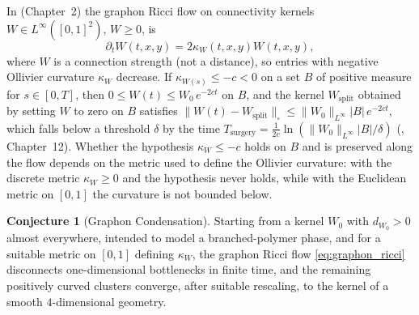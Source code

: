 \documentclass[11pt,a4paper,reqno]{amsart}
\theoremstyle{definition}
\newtheorem{conjecture}[theorem]{Conjecture}
\numberwithin{equation}{section}
\newcommand{\cutnorm}[1]{\|#1\|_{\square}}
\begin{document}
In \cite{silvafilho2026treatise} (Chapter~2) the graphon Ricci flow on connectivity kernels $W \in L^\infty([0, 1]^2)$, $W \ge 0$, is
\begin{equation}
    \label{eq:graphon_ricci}
    \partial_t W(t, x, y) = 2 \kappa_W(t, x, y) W(t, x, y),
\end{equation}
where $W$ is a connection strength (not a distance), so entries with negative Ollivier curvature $\kappa_W$ decrease. If $\kappa_{W(s)} \le -c < 0$ on a set $B$ of positive measure for $s \in [0, T]$, then $0 \le W(t) \le W_0\, e^{-2ct}$ on $B$, and the kernel $W_{\mathrm{split}}$ obtained by setting $W$ to zero on $B$ satisfies $\cutnorm{W(t) - W_{\mathrm{split}}} \le \|W_0\|_{L^\infty} |B|\, e^{-2ct}$, which falls below a threshold $\delta$ by the time $T_{\mathrm{surgery}} = \frac{1}{2c} \ln\left( \|W_0\|_{L^\infty}|B|/\delta \right)$ (\cite{silvafilho2026treatise}, Chapter~12). Whether the hypothesis $\kappa_W \le -c$ holds on $B$ and is preserved along the flow depends on the metric used to define the Ollivier curvature: with the discrete metric $\kappa_W \ge 0$ and the hypothesis never holds, while with the Euclidean metric on $[0,1]$ the curvature is not bounded below.

\begin{conjecture}[Graphon Condensation]
\label{conj:graphon_condensation}
Starting from a kernel $W_0$ with $d_{W_0} > 0$ almost everywhere, intended to model a branched-polymer phase, and for a suitable metric on $[0,1]$ defining $\kappa_W$, the graphon Ricci flow \eqref{eq:graphon_ricci} disconnects one-dimensional bottlenecks in finite time, and the remaining positively curved clusters converge, after suitable rescaling, to the kernel of a smooth $4$-dimensional geometry.
\end{conjecture}
\end{document}
